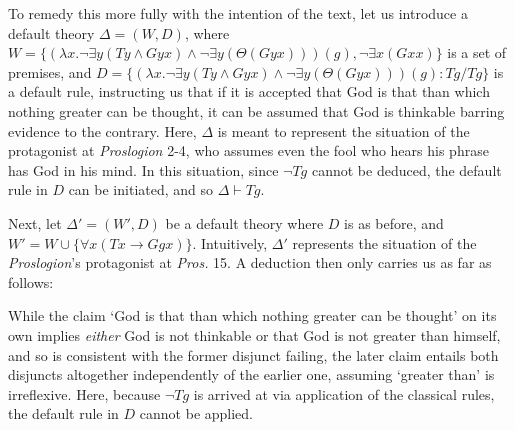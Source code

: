 \documentclass[]{birkjour}
\begin{document}
To remedy this more fully with the intention of the text, let us introduce a default theory $\Delta = (W, D)$, where $W = \{(\lambda x. \neg \exists y (Ty \wedge Gyx) \wedge \neg\exists y(\Theta(Gyx)))(g), \neg \exists x (Gxx)\}$ is a set of premises, and $D = \{(\lambda x. \neg \exists y (Ty \wedge Gyx) \wedge \neg\exists y(\Theta(Gyx)))(g) : Tg/Tg\}$ is a default rule, instructing us that if it is accepted that God is that than which nothing greater can be thought, it can be assumed that God is thinkable barring evidence to the contrary. Here, $\Delta$ is meant to represent the situation of the protagonist at \textit{Proslogion} 2-4, who assumes even the fool who hears his phrase has God in his mind. In this situation, since $\neg Tg$ cannot be deduced, the default rule in $D$ can be initiated, and so $\Delta \vdash Tg$.

Next, let $\Delta' =(W', D)$ be a default theory where $D$ is as before, and $W' = W \cup \{\forall x (Tx \rightarrow Ggx)\}$. Intuitively, $\Delta'$ represents the situation of the \textit{Proslogion}'s protagonist at \textit{Pros.} 15. A deduction then only carries us as far as follows:

\bigskip


\bigskip

While the claim `God is that than which nothing greater can be thought' on its own implies \textit{either} God is not thinkable or that God is not greater than himself, and so is consistent with the former disjunct failing, the later claim entails both disjuncts altogether independently of the earlier one, assuming `greater than' is irreflexive. Here, because $\neg Tg$ is arrived at via application of the classical rules, the default rule in $D$ cannot be applied.
\end{document}
